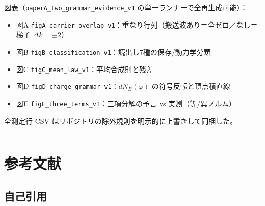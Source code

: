 \documentclass[
  a4paper,
]{ltjsarticle}
\providecommand{\tightlist}{%
  \setlength{\itemsep}{0pt}\setlength{\parskip}{0pt}}
\begin{document}
図表（\texttt{paperA\_two\_grammar\_evidence\_v1}
の単一ランナーで全再生成可能）：

\begin{itemize}
\tightlist
\item
  図A
  \texttt{figA\_carrier\_overlap\_v1}：重なり行列（搬送波あり＝全ゼロ／なし＝梯子
  \(\Delta k=\pm2\)）
\item
  図B \texttt{figB\_classification\_v1}：読出し7種の保存/動力学分類
\item
  図C \texttt{figC\_mean\_law\_v1}：平均合成則と残差
\item
  図D \texttt{figD\_charge\_grammar\_v1}：\(dN_B(\varphi)\)
  の符号反転と頂点積直線
\item
  図E \texttt{figE\_three\_terms\_v1}：三項分解の予言 vs
  実測（等/異ノルム）
\end{itemize}

全測定行 CSV はリポジトリの除外規則を明示的に上書きして同梱した。

\begin{center}\rule{0.5\linewidth}{0.5pt}\end{center}

\section{参考文献}\label{ux53c2ux8003ux6587ux732e}

\subsection{自己引用}\label{ux81eaux5df1ux5f15ux7528}
\end{document}
